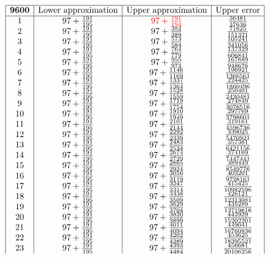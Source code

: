 \documentclass{amsart}
\begin{document}
$$\begin{array}{|c|c|c|c|}
 \hline
 {\bf 9600}&\text{Lower approximation}&\text{Upper approximation}&\text{Upper error}\\
 \hline
 1&97+\frac{191}{195}&{\color{red}97+\frac{191}{194}}&\frac{36481}{37636}\\
2&97+\frac{191}{195}&97+\frac{382}{389}&\frac{71625}{151321}\\
3&97+\frac{191}{195}&97+\frac{573}{584}&\frac{105241}{341056}\\
4&97+\frac{191}{195}&97+\frac{764}{779}&\frac{137329}{606841}\\
5&97+\frac{191}{195}&97+\frac{955}{974}&\frac{167889}{948676}\\
6&97+\frac{191}{195}&97+\frac{1146}{1169}&\frac{196921}{1366561}\\
7&97+\frac{191}{195}&97+\frac{1337}{1364}&\frac{224425}{1860496}\\
8&97+\frac{191}{195}&97+\frac{1528}{1559}&\frac{250401}{2430481}\\
9&97+\frac{191}{195}&97+\frac{1719}{1754}&\frac{274849}{3076516}\\
10&97+\frac{191}{195}&97+\frac{1910}{1949}&\frac{297769}{3798601}\\
11&97+\frac{191}{195}&97+\frac{2101}{2144}&\frac{319161}{4596736}\\
12&97+\frac{191}{195}&97+\frac{2292}{2339}&\frac{339025}{5470921}\\
13&97+\frac{191}{195}&97+\frac{2483}{2534}&\frac{357361}{6421156}\\
14&97+\frac{191}{195}&97+\frac{2674}{2729}&\frac{374169}{7447441}\\
15&97+\frac{191}{195}&97+\frac{2865}{2924}&\frac{389449}{8549776}\\
16&97+\frac{191}{195}&97+\frac{3056}{3119}&\frac{403201}{9728161}\\
17&97+\frac{191}{195}&97+\frac{3247}{3314}&\frac{415425}{10982596}\\
18&97+\frac{191}{195}&97+\frac{3438}{3509}&\frac{426121}{12313081}\\
19&97+\frac{191}{195}&97+\frac{3629}{3704}&\frac{435289}{13719616}\\
20&97+\frac{191}{195}&97+\frac{3820}{3899}&\frac{442929}{15202201}\\
21&97+\frac{191}{195}&97+\frac{4011}{4094}&\frac{449041}{16760836}\\ 
22&97+\frac{191}{195}&97+\frac{4202}{4289}&\frac{453625}{18395521}\\
23&97+\frac{191}{195}&97+\frac{4393}{4484}&\frac{456681}{20106256}\\

\end{array}$$
\end{document}
